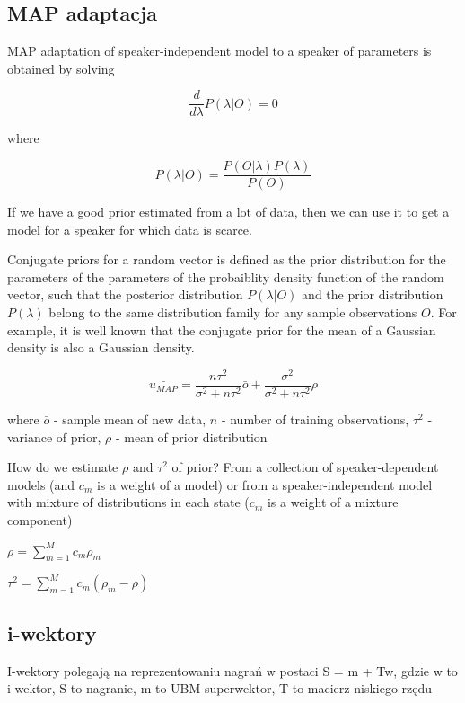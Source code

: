 \subsection{MAP adaptacja}

MAP adaptation of speaker-independent model to a speaker of parameters is obtained by solving 

$$\frac{d}{d\lambda} P(\lambda | O) = 0$$

where

$$P(\lambda | O) = \frac{P(O | \lambda)P(\lambda)}{P(O)}$$

If we have a good prior estimated from a lot of data, then we can use it to get a model for a speaker for which data is scarce.

Conjugate priors for a random vector is defined as the prior distribution for the parameters of the parameters of the probaiblity density function of the random vector, such that the posterior distribution $P(\lambda | O)$ and the prior distribution $P(\lambda)$ belong to the same distribution family for any sample observations $O$.
For example, it is well known that the conjugate prior for the mean of a Gaussian density is also a Gaussian density.

$$\bar{u_{MAP}} = \frac{n \tau^2}{\sigma^2 + n \tau^2} \bar{o} + \frac{\sigma^2}{\sigma^2 + n \tau^2} \rho$$

where $\bar{o}$ - sample mean of new data, $n$ - number of training observations, $\tau^2$ - variance of prior, $\rho$ - mean of prior distribution

How do we estimate $\rho$ and $\tau^2$ of prior? From a collection of speaker-dependent models (and $c_m$ is a weight of a model) or from a speaker-independent model with mixture of distributions in each state ($c_m$ is a weight of a mixture component)

$\rho = \sum_{m=1}^M c_m \rho_m$

$\tau^2 = \sum_{m=1}^M c_m (\rho_m - \rho)$


\subsection{i-wektory}

I-wektory polegają na reprezentowaniu nagrań w postaci S = m + Tw, gdzie w to i-wektor, S to nagranie, m to UBM-superwektor, T to macierz niskiego rzędu

